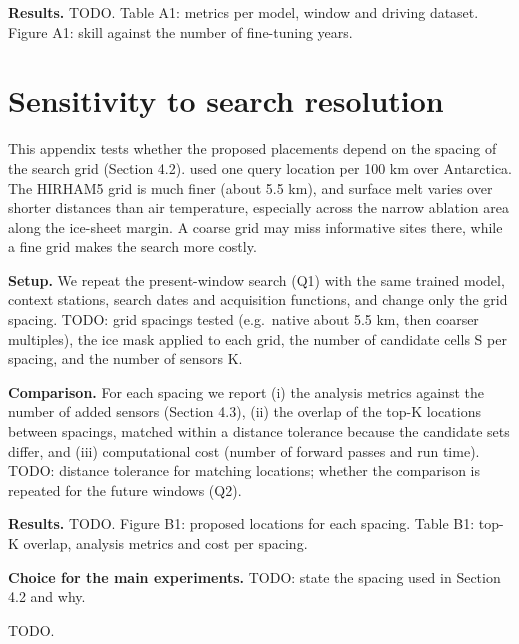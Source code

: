 \documentclass[tc, manuscript]{copernicus}
\begin{document}
\textbf{Results.} TODO. Table A1: metrics per model, window and driving
dataset. Figure A1: skill against the number of fine-tuning years.

\section{Sensitivity to search
resolution}\label{appendix-b-sensitivity-to-search-resolution}

This appendix tests whether the proposed placements depend on the
spacing of the search grid (Section 4.2). \citet{andersson2023} used one
query location per 100 km over Antarctica. The HIRHAM5 grid is much
finer (about 5.5 km), and surface melt varies over shorter distances
than air temperature, especially across the narrow ablation area along
the ice-sheet margin. A coarse grid may miss informative sites there,
while a fine grid makes the search more costly.

\textbf{Setup.} We repeat the present-window search (Q1) with the same
trained model, context stations, search dates and acquisition functions,
and change only the grid spacing. TODO: grid spacings tested
(e.g.~native about 5.5 km, then coarser multiples), the ice mask applied
to each grid, the number of candidate cells S per spacing, and the
number of sensors K.

\textbf{Comparison.} For each spacing we report (i) the analysis metrics
against the number of added sensors (Section 4.3), (ii) the overlap of
the top-K locations between spacings, matched within a distance
tolerance because the candidate sets differ, and (iii) computational
cost (number of forward passes and run time). TODO: distance tolerance
for matching locations; whether the comparison is repeated for the
future windows (Q2).

\textbf{Results.} TODO. Figure B1: proposed locations for each spacing.
Table B1: top-K overlap, analysis metrics and cost per spacing.

\textbf{Choice for the main experiments.} TODO: state the spacing used
in Section 4.2 and why.

\noappendix



\begin{acknowledgements}
TODO.
\end{acknowledgements}



\end{document}
